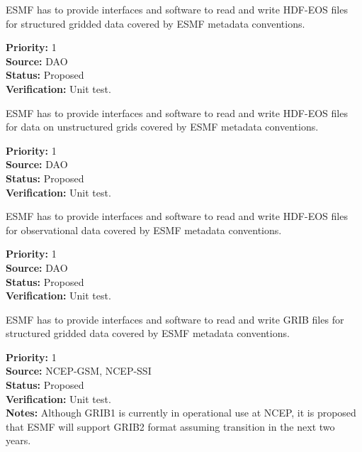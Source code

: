 
ESMF has to provide interfaces and software to read and write HDF-EOS
files for structured gridded data covered by ESMF metadata conventions.


\begin{reqlist}
{\bf Priority:} 1 \\
{\bf Source:} DAO \\
{\bf Status:} Proposed \\
{\bf Verification:} Unit test. \\
\end{reqlist}



ESMF has to provide interfaces and software to read and write HDF-EOS
files for data on unstructured grids covered by ESMF metadata conventions.


\begin{reqlist}
{\bf Priority:} 1 \\
{\bf Source:} DAO \\
{\bf Status:} Proposed \\
{\bf Verification:} Unit test. \\
\end{reqlist}



ESMF has to provide interfaces and software to read and write HDF-EOS
files for observational data  covered by ESMF metadata conventions.


\begin{reqlist}
{\bf Priority:} 1 \\
{\bf Source:} DAO \\
{\bf Status:} Proposed \\
{\bf Verification:} Unit test. \\
\end{reqlist}




ESMF has to provide interfaces and software to read and write GRIB
files for structured gridded data covered by ESMF metadata conventions.

\begin{reqlist}
{\bf Priority:} 1 \\
{\bf Source:} NCEP-GSM, NCEP-SSI \\
{\bf Status:} Proposed \\
{\bf Verification:} Unit test. \\
{\bf Notes:} Although GRIB1 is currently in operational use at NCEP,
it is proposed that ESMF will support GRIB2 format assuming transition
in the next two years.
\end{reqlist}


